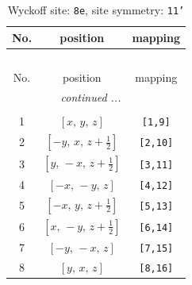 \documentclass[fleqn,8pt]{jsarticle}
\begin{document}
\renewcommand{\arraystretch}{1.2}
\begin{longtable}{ccc}
\caption{Wyckoff site: {\tt 8e}, site symmetry: {\tt 11'}}
 \\
 \hline \hline
No. & position & mapping \\ \hline \endfirsthead

\multicolumn{2}{l}{\tablename\ \thetable{}} \\
 \hline \hline
No. & position & mapping \\ \hline \endhead

 \hline \hline
\multicolumn{2}{r}{\footnotesize\it continued ...} \\ \endfoot

 \hline \hline
\multicolumn{2}{r}{} \\ \endlastfoot

1 & $\left[ x,\, y,\, z \right]$ & {\tt [1,9]} \\ \hline
2 & $\left[ - y,\, x,\, z + \frac{1}{2} \right]$ & {\tt [2,10]} \\ \hline
3 & $\left[ y,\, - x,\, z + \frac{1}{2} \right]$ & {\tt [3,11]} \\ \hline
4 & $\left[ - x,\, - y,\, z \right]$ & {\tt [4,12]} \\ \hline
5 & $\left[ - x,\, y,\, z + \frac{1}{2} \right]$ & {\tt [5,13]} \\ \hline
6 & $\left[ x,\, - y,\, z + \frac{1}{2} \right]$ & {\tt [6,14]} \\ \hline
7 & $\left[ - y,\, - x,\, z \right]$ & {\tt [7,15]} \\ \hline
8 & $\left[ y,\, x,\, z \right]$ & {\tt [8,16]} \\
\end{longtable}
\end{document}
